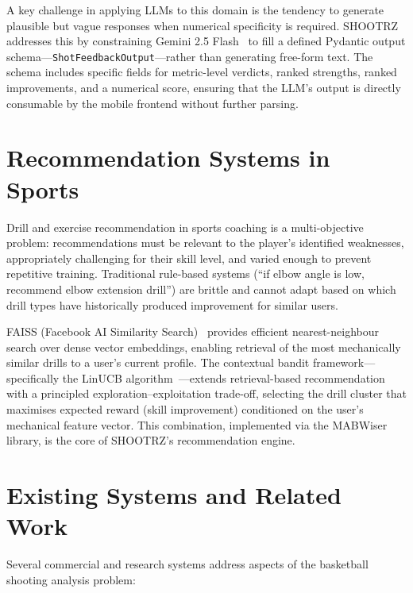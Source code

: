\begin{sloppypar}
A key challenge in applying LLMs to this domain is the tendency to generate plausible but vague responses when numerical specificity is required. SHOOTRZ addresses this by constraining Gemini 2.5 Flash~\cite{Gemini2024} to fill a defined Pydantic output schema---\lstinline|ShotFeedbackOutput|---rather than generating free-form text. The schema includes specific fields for metric-level verdicts, ranked strengths, ranked improvements, and a numerical score, ensuring that the LLM's output is directly consumable by the mobile frontend without further parsing.
\end{sloppypar}

\section{Recommendation Systems in Sports}
\label{sec:recommendation}

Drill and exercise recommendation in sports coaching is a multi-objective problem: recommendations must be relevant to the player's identified weaknesses, appropriately challenging for their skill level, and varied enough to prevent repetitive training. Traditional rule-based systems (``if elbow angle is low, recommend elbow extension drill'') are brittle and cannot adapt based on which drill types have historically produced improvement for similar users.

\begin{sloppypar}
FAISS (Facebook AI Similarity Search)~\cite{Johnson2019} provides efficient nearest-neighbour search over dense vector embeddings, enabling retrieval of the most mechanically similar drills to a user's current profile. The contextual bandit framework---specifically the LinUCB algorithm~\cite{Li2010}---extends retrieval-based recommendation with a principled exploration--exploitation trade-off, selecting the drill cluster that maximises expected reward (skill improvement) conditioned on the user's mechanical feature vector. This combination, implemented via the MABWiser library, is the core of SHOOTRZ's recommendation engine.
\end{sloppypar}

\section{Existing Systems and Related Work}
\label{sec:related_work}

Several commercial and research systems address aspects of the basketball shooting analysis problem:

